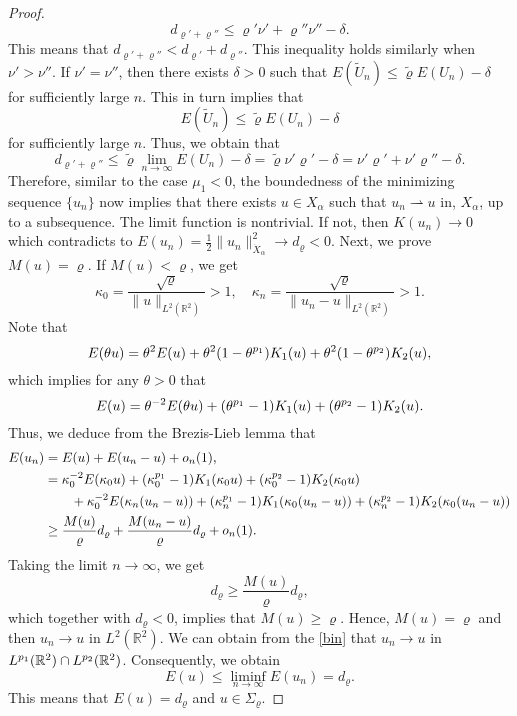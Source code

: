 \documentclass[10pt]{article}
\numberwithin{equation}{section}
\newcommand{\lt}{{L^2(\mathbb{R}^2)}}
\newcommand{\xx}{{\dot{X}_\alpha}}
\newcommand{\vr}{{\varrho}}
\newcommand{\al}{\alpha}
\newcommand{\rt}{{\mathbb{R}^2}}
\begin{document}
\begin{proof}
		\[
		d_{\vr'+\vr''}\leq\vr'\nu'+\vr''\nu''-\delta.
		\]
		This means that $d_{\vr'+\vr''}<d_{\vr'}+d_{\vr''}$. This inequality holds similarly when $\nu'>\nu''$. If $\nu'=\nu''$, then there exists $\delta>0$ such that $E(\tilde U_n)\leq \tilde\vr E(U_n)-\delta$ for sufficiently large $n$. This in turn implies that
		\[
		E(\tilde U_n)\leq\tilde\vr E(U_n)-\delta
		\]
		for sufficiently large $n$. Thus, we obtain that $$d_{\vr'+\vr''}\leq\tilde\vr\lim_{n\to\infty}E(U_n)-\delta=\tilde\vr\nu'\vr'-\delta=\nu'\vr'+\nu'\vr''-\delta.$$
		Therefore,  similar to the case $\mu_1<0$, the boundedness of the minimizing sequence $\{u_n\}$ now implies that there exists $u\in X_\al$ such that $u_n\rightharpoonup u$ in,  $X_\al$, up to a subsequence. The limit function is nontrivial. If not, then $K(u_n)\to0$ which contradicts to $E(u_n)=\frac12\|u_n\|_\xx^2\to d_\varrho<0$.
		Next, we prove $M(u)=\varrho$. If $M(u)<\varrho$, we get
		\[
		\kappa_0=\frac{\sqrt\varrho}{\|u\|_\lt}>1,\quad\kappa_n=\frac{\sqrt\varrho}{\|u_n-u\|_\lt}>1.
		\]
		Note that 
		\[
		E(\theta u)
		=\theta^2 E(u)+\theta^2(1-\theta^{p_1})K_1(u)+\theta^2(1-\theta^{p_2})K_2(u),
		\]
		which implies for any $\theta>0$ that
		\[
		E(u)
		=\theta^{-2} E(\theta u)+ (\theta^{p_1}-1)K_1(u)+ (\theta^{p_2}-1)K_2(u).
		\]
		Thus, we deduce from the Brezis-Lieb lemma that
		\[
		\begin{split}
			E(u_n)&=E(u)+E(u_n-u)+o_n(1),\\
			&=\kappa_0^{-2}E(\kappa_0 u)
			+ (\kappa_0^{p_1}-1)K_1(\kappa_0u)+ (\kappa_0^{p_2}-1)K_2(\kappa_0u)\\
			&\qquad+\kappa_0^{-2}E(\kappa_n (u_n-u))
			+ (\kappa_n^{p_1}-1)K_1(\kappa_0(u_n-u))+ (\kappa_n^{p_2}-1)K_2(\kappa_0(u_n-u))\\
			&\geq\frac{M(u)}{\varrho}d_\varrho
			+\frac{M(u_n-u)}{\varrho}d_\varrho+o_n(1).
		\end{split}
		\]
		Taking the limit $n\to\infty$, we get
		\[
		d_\varrho\geq\frac{M(u)}{\varrho}d_\varrho,
		\]
		which together with $d_\varrho<0$, implies that $M(u)\geq\varrho$. Hence, $M(u)=\varrho$ and then $u_n\to u$ in $\lt$. We can obtain from the \eqref{bin} that $u_n\to u$ in $L^\po(\rt)\cap L^\poo(\rt)$. Consequently, we obtain 
		\[
		E(u)\leq\liminf_{n\to\infty}E(u_n)=d_\varrho.
		\] 
		This means that $E(u)=d_\varrho$ and $u\in \Sigma_\varrho$.
	\end{proof} 
	
\end{document}
